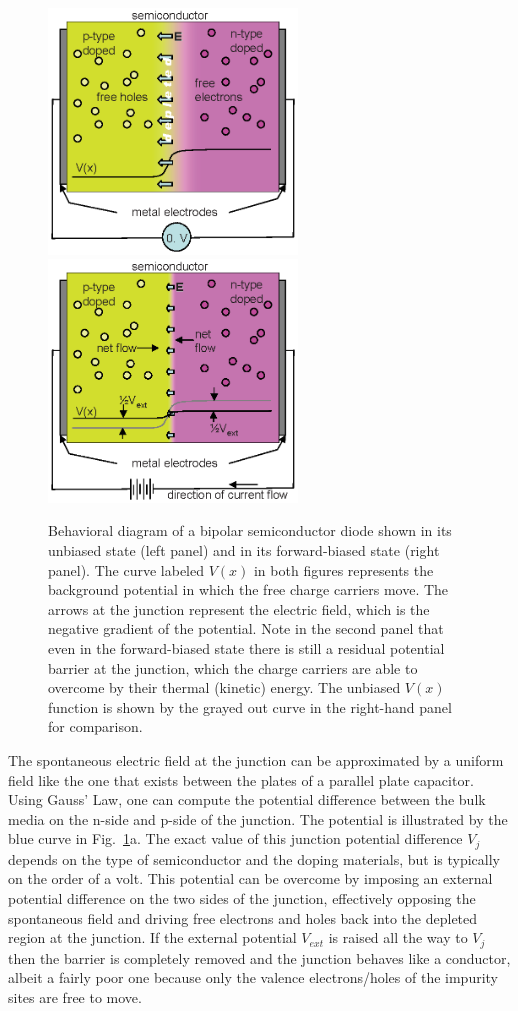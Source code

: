 \documentclass{revtex4}
\begin{document}
\begin{figure}
\includegraphics[width=2.6in]{junctionfiga.eps}
\includegraphics[width=2.6in]{junctionfigb.eps}
\caption{\label{junctionfig}
Behavioral diagram of a bipolar semiconductor diode shown in its unbiased
state (left panel) and in its forward-biased state (right panel).  The
curve labeled $V(x)$ in both figures represents the background potential
in which the free charge carriers move.  The arrows at the junction
represent the electric field, which is the negative gradient of the potential.
Note in the second panel that even in the forward-biased state there is still
a residual potential barrier at the junction, which the charge carriers are
able to overcome by their thermal (kinetic) energy.  The unbiased $V(x)$
function is shown by the grayed out curve in the right-hand panel for 
comparison.}
\end{figure}

The spontaneous electric field at the junction can be approximated by a
uniform field like the one that exists between the plates of a parallel plate
capacitor.  Using Gauss' Law, one can compute the potential difference
between the bulk media on the n-side and p-side of the junction.  The
potential is illustrated by the blue curve in Fig.~\ref{junctionfig}a.  The
exact value of this junction potential difference $V_j$ depends on the type
of semiconductor and the doping materials, but is typically on the order of
a volt.  This potential can be overcome by imposing an external potential
difference on the two sides of the junction, effectively opposing the
spontaneous field and driving free electrons and holes back into the
depleted region at the junction.  If the external potential $V_{ext}$ is raised
all the way to $V_j$ then the barrier is completely removed and the junction
behaves like a conductor, albeit a fairly poor one because only the valence
electrons/holes of the impurity sites are free to move.
\end{document}
